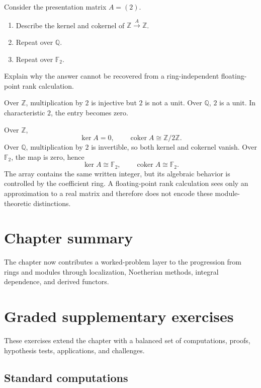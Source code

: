 \begin{exercise}\label{exr:v12-exact-ring-01}
Consider the presentation matrix \(A=(2)\).

\begin{enumerate}
\item Describe the kernel and cokernel of
\(\mathbb Z\xrightarrow{A}\mathbb Z\).
\item Repeat over \(\mathbb Q\).
\item Repeat over \(\mathbb F_2\).
\end{enumerate}

Explain why the answer cannot be recovered from a ring-independent
floating-point rank calculation.
\end{exercise}
\begin{hint}
Over \(\mathbb Z\), multiplication by \(2\) is injective but \(2\) is not a
unit.  Over \(\mathbb Q\), \(2\) is a unit.  In characteristic \(2\), the
entry becomes zero.
\end{hint}
\begin{solution}
Over \(\mathbb Z\),
\[
\ker A=0,
\qquad
\operatorname{coker}A\cong\mathbb Z/2\mathbb Z.
\]
Over \(\mathbb Q\), multiplication by \(2\) is invertible, so both kernel and
cokernel vanish.  Over \(\mathbb F_2\), the map is zero, hence
\[
\ker A\cong\mathbb F_2,
\qquad
\operatorname{coker}A\cong\mathbb F_2.
\]
The array contains the same written integer, but its algebraic behavior is
controlled by the coefficient ring.  A floating-point rank calculation sees
only an approximation to a real matrix and therefore does not encode these
module-theoretic distinctions.
\end{solution}

\section*{Chapter summary}
The chapter now contributes a worked-problem layer to the progression from rings and modules through localization, Noetherian methods, integral dependence, and derived functors.
\section{Graded supplementary exercises}
These exercises extend the chapter with a balanced set of computations, proofs, hypothesis tests, applications, and challenges.

\subsection*{Standard computations}

